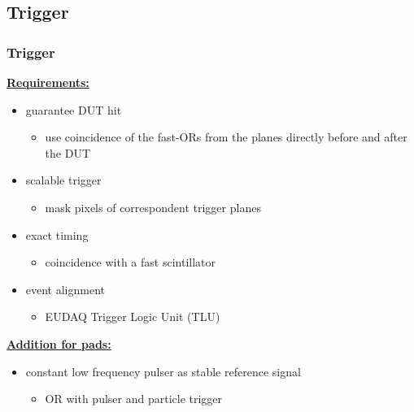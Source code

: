 \documentclass[9pt]{beamer}
\begin{document}
\subsection{Trigger}
\begin{frame}
	\frametitle{Trigger}
	\underline{\textbf{Requirements:}}\s
	\begin{itemize}
		\setlength{\itemsep}{\fill}
		\item guarantee DUT hit
		\begin{itemize}
			\item use coincidence of the fast-ORs from the planes directly before and after the DUT
		\end{itemize}
		\item scalable trigger
		\begin{itemize}
			\item mask pixels of correspondent trigger planes
		\end{itemize}
		\item exact timing
		\begin{itemize}
			\item coincidence with a fast scintillator
		\end{itemize}
		\item event alignment
		\begin{itemize}
			\item EUDAQ Trigger Logic Unit (TLU)
		\end{itemize}
	\end{itemize}
	\vspace*{.5cm}
	\underline{\textbf{Addition for pads:}}\s
	\begin{itemize}
		\item constant low frequency pulser as stable reference signal
		\begin{itemize}
			\item OR with pulser and particle trigger
		\end{itemize}
	\end{itemize}
\end{frame}
\end{document}
